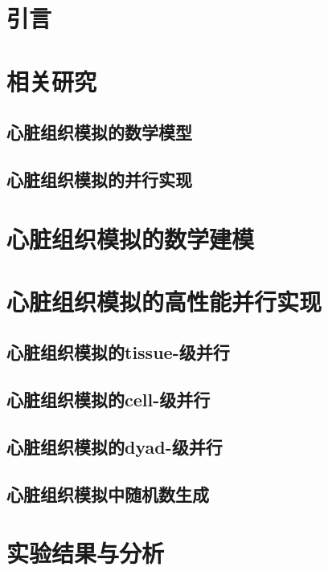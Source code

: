 \section{引言}




\section{相关研究}
\subsection{心脏组织模拟的数学模型}



\subsection{心脏组织模拟的并行实现}


\section{心脏组织模拟的数学建模}


\section{心脏组织模拟的高性能并行实现}

 \subsection{心脏组织模拟的tissue-级并行}
 
 \subsection{心脏组织模拟的cell-级并行}

\subsection{心脏组织模拟的dyad-级并行}

\subsection{心脏组织模拟中随机数生成}



\section{实验结果与分析}
